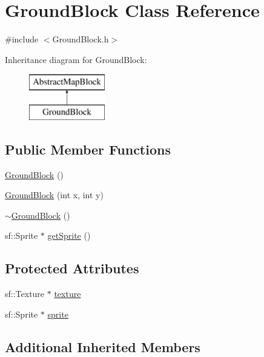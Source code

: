 \hypertarget{class_ground_block}{}\section{Ground\+Block Class Reference}
\label{class_ground_block}


{\ttfamily \#include $<$Ground\+Block.\+h$>$}

Inheritance diagram for Ground\+Block\+:\begin{figure}[H]
\begin{center}
\leavevmode
\includegraphics[height=2.000000cm]{class_ground_block}
\end{center}
\end{figure}
\subsection*{Public Member Functions}
\begin{DoxyCompactItemize}
\item 
\hyperlink{class_ground_block_adb573a253a45cd9ee4d2c2b51dadcd87}{Ground\+Block} ()
\item 
\hyperlink{class_ground_block_a0155a6938214c2752002828b9e26da0a}{Ground\+Block} (int x, int y)
\item 
\hyperlink{class_ground_block_a2f81acbda3a2b1c4a901a59de60124d0}{$\sim$\+Ground\+Block} ()
\item 
sf\+::\+Sprite $\ast$ \hyperlink{class_ground_block_a73c0f8ff59ef53b18f03bc3f22f8f810}{get\+Sprite} ()
\end{DoxyCompactItemize}
\subsection*{Protected Attributes}
\begin{DoxyCompactItemize}
\item 
sf\+::\+Texture $\ast$ \hyperlink{class_ground_block_af610cda7ad96e934524a7bbdc13a64d6}{texture}
\item 
sf\+::\+Sprite $\ast$ \hyperlink{class_ground_block_a235135fde9ffb53700b4bee134175dda}{sprite}
\end{DoxyCompactItemize}
\subsection*{Additional Inherited Members}


